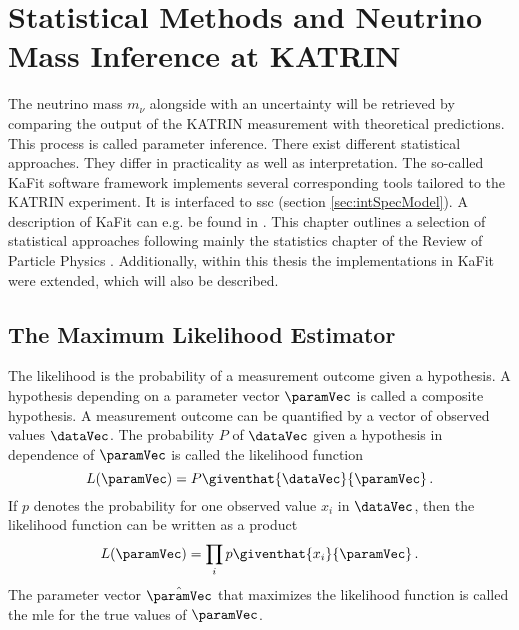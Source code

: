 \def\currentRootFolder{chapter/statisticalMethods}
\def\currentFigureFolder{\currentRootFolder/fig}


\chapter{Statistical Methods and Neutrino Mass Inference at KATRIN}
\label{sec:statMethods}
The neutrino mass $m_\nu$ alongside with an uncertainty will be retrieved by comparing the output of the KATRIN measurement with theoretical predictions. This process is called parameter inference. There exist different statistical approaches. They differ in practicality as well as interpretation. The so-called KaFit software framework implements several corresponding tools tailored to the KATRIN experiment. It is interfaced to \gls{ssc} (section \ref{sec:intSpecModel}). A description of KaFit can e.g. be found in \cite{Kleesiek2014}. This chapter outlines a selection of statistical approaches following mainly the statistics chapter of the Review of Particle Physics \cite{ReviewOfParticlePhysics}. Additionally, within this thesis the implementations in KaFit were extended, which will also be described.

\section{The Maximum Likelihood Estimator}
The likelihood is the probability of a measurement outcome given a hypothesis. A hypothesis depending on a parameter vector $\paramVec$ is called a composite hypothesis. A measurement outcome can be quantified by a vector of observed values $\dataVec$. The probability $P$ of $\dataVec$ given a hypothesis in dependence of $\paramVec$ is called the likelihood function
\begin{equation}
	L(\paramVec) = P\giventhat{\dataVec}{\paramVec}
	\fullstop
\end{equation}
If $p$ denotes the probability for one observed value $x_i$ in $\dataVec$, then the likelihood function can be written as a product
\begin{equation}
	L(\paramVec) = \prod_{i} p\giventhat{x_i}{\paramVec}
	\fullstop
\end{equation}
The parameter vector $\hat{\paramVec}$ that maximizes the likelihood function is called the \gls{mle} for the true values of $\paramVec$.

